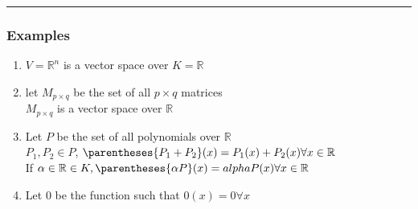 \documentclass[12pt]{article}
\newcommand\real[0]{\mathbb{R}}
\newcommand{\divider}[0]{\rule{\textwidth}{0.1pt}}
\begin{document}
\divider

\subsubsection{Examples}

\begin{enumerate}
	\item $V = \real^n$ is a vector space over $K = \real$
	\item let $M_{p \times q}$ be the set of all $p \times q$ matrices \\
	$M_{p \times q}$ is a vector space over $\real$
	\item Let $P$ be the set of all polynomials over $\real$ \\
	$P_1, P_2 \in P$, $\parentheses{P_1 + P_2}(x) = P_1(x) + P_2(x) \forall x \in \real$ \\
	If $\alpha \in \real \in K, \parentheses{\alpha P}(x) = alpha P(x) \forall x \in \real$
	\item Let $0$ be the function such that $0(x) = 0 \forall x$ 
\end{enumerate}
\end{document}
